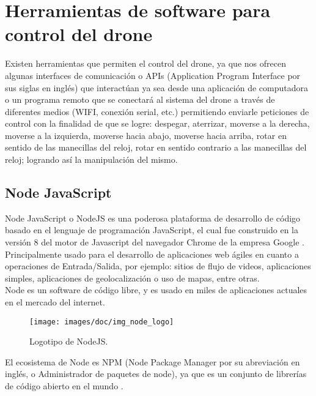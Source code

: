 %

\section{Herramientas de software para control del drone}

Existen herramientas que permiten el control del drone, ya que nos ofrecen 
algunas interfaces de comunicación o APIs (Application Program Interface por sus 
siglas en inglés) que interactúan ya sea desde una aplicación de computadora o 
un programa remoto que se conectará al sistema del drone a través de diferentes 
medios (WIFI, conexión serial, etc.) permitiendo enviarle peticiones de control 
con la finalidad de que se logre: despegar, aterrizar, moverse a la derecha, 
moverse a la izquierda, moverse hacia abajo, moverse hacia arriba, rotar en 
sentido de las manecillas del reloj, rotar en sentido contrario a las manecillas 
del reloj; logrando así la manipulación del mismo. \\

%
\subsection{Node JavaScript}

Node JavaScript o NodeJS es una poderosa plataforma de desarrollo de código 
basado en el lenguaje de programación JavaScript, el cual fue construido en la 
versión 8 del motor de Javascript del navegador Chrome de la empresa Google 
\cite{node_js_tutorial}. \\
Principalmente usado para el desarrollo de aplicaciones web ágiles en cuanto a 
operaciones de Entrada/Salida, por ejemplo: sitios de flujo de videos, 
aplicaciones simples, aplicaciones de geolocalización o uso de mapas, entre 
otras. \\
Node es un software de código libre, y es usado en miles de aplicaciones 
actuales en el mercado del internet. \\

\begin{figure}[hbtp!]
	\begin{center} 
		\texttt{[image: images/doc/img\_node\_logo]}
		\caption{Logotipo de NodeJS.}
	\end{center}
\end{figure}

El ecosistema de Node es NPM (Node Package Manager por su abreviación en inglés, 
o Administrador de paquetes de node), ya que es un conjunto de librerías de 
código abierto en el mundo \cite{npm_program}. \\


